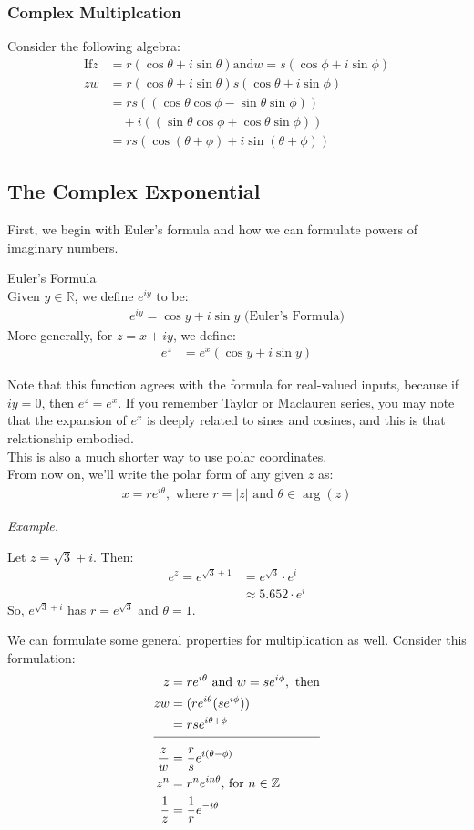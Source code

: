 \documentclass[10pt]{paper}
\newcommand{\Z}{\mathbb{Z}}\newcommand{\R}{\mathbb{R}}\newcommand{\N}{\mathbb{N}}\newcommand{\Q}{\mathbb{Q}}\newcommand{\C}{\mathbb{C}}
\newcommand{\gspc}{\vspace{0.13cm}} %
\newcommand{\gline}[0]{\gspc\\} %
\newcommand{\ahline}{\\[3pt]\hline\\[-8pt]}
\renewenvironment{example}{
  \begin{tcolorbox}[colback=gray!2, colframe=gray!40!white, coltitle=green!20!black, boxrule=3pt, sharp corners]
    \textit{Example. }
}{\end{tcolorbox}}
\begin{document}
\subsubsection*{Complex Multiplcation}
Consider the following algebra:
\begin{align*} 
  \mathrm{If }z &= r(\cos\theta+i\sin\theta)\mathrm{ and }w=s(\cos\phi+i\sin\phi)\\
  zw&= r (\cos\theta+i\sin\theta)s(\cos\theta+i\sin\phi)\\
  &= rs((\cos\theta\cos\phi-\sin\theta\sin\phi))\\&\quad+i((\sin\theta\cos\phi + \cos\theta\sin\phi))\\
  &= rs(\cos(\theta+\phi)+i\sin(\theta+\phi))
\end{align*}
\subsection{The Complex Exponential}
First, we begin with Euler's formula and how we can formulate powers of imaginary numbers. 
\begin{definition}{Euler's Formula}{}\gline{}
  Given $y\in\R$, we define $e^{iy}$ to be:
  \begin{align*}
    e^{iy}=\cos y + i \sin y \text{ (Euler's Formula)}
  \end{align*}
  More generally, for $z = x + iy$, we define:
  \begin{align*}
    e^{z}&= e^x(\cos y + i\sin y)
  \end{align*}
\end{definition}
Note that this function agrees with the formula for real-valued inputs, because if $iy = 0$, then $e^z = e^x$. If you remember Taylor or Maclauren series, you may note that the expansion of $e^x$ is deeply related to sines and cosines, and this is that relationship embodied. \gline{}
This is also a much shorter way to use polar coordinates. \gline{}From now on, we'll write the polar form of any given $z$ as:
\begin{align*}
  x = re^{i\theta}, \text{ where }r = |z| \text{ and }\theta\in\arg(z)
\end{align*}
\begin{example}
  Let $z = \sqrt 3 + i$. Then:
  \begin{align*}
    e^z = e^{\sqrt 3 + 1} &= e^{\sqrt 3}\cdot e^i\\
    &\approx 5.652\cdot e^{i}
  \end{align*}
  So, $e^{\sqrt 3 + i}$ has $r = e^{\sqrt 3}$ and $\theta = 1$. 
\end{example}
We can formulate some general properties for multiplication as well. Consider this formulation:
\begin{align*}
  z &= re^{i\theta} \text{ and } w= se^{i\phi}, \text{ then}\\
  zw&= (re^{i\theta}(se^{i\phi}))\\
  &= rse^{i\theta + \phi}\ahline
  \frac{z}w &= \frac{r}se^{i(\theta - \phi)}\\
  z^n&= r^ne^{in\theta}\text{, for }n\in\Z\\
  \frac{1}z&= \frac{1}re^{-i\theta}
\end{align*}
\end{document}
